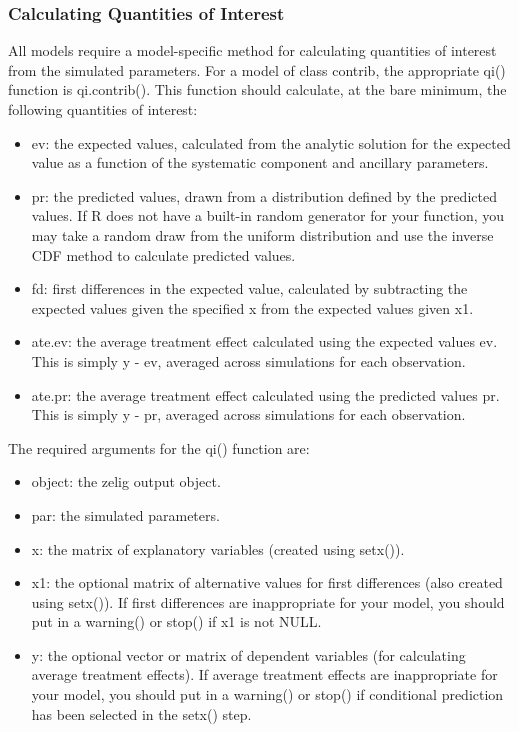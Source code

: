 \documentclass[letterpaper,10pt,english]{sphinxmanual}
\begin{document}
\subsubsection{Calculating Quantities of Interest}
\label{9_adding_models_and_methods:calculating-quantities-of-interest}
All models require a model-specific method for calculating quantities of
interest from the simulated parameters. For a model of class contrib,
the appropriate qi() function is qi.contrib(). This function should
calculate, at the bare minimum, the following quantities of interest:
\begin{itemize}
\item {} 
ev: the expected values, calculated from the analytic solution for
the expected value as a function of the systematic component and
ancillary parameters.

\item {} 
pr: the predicted values, drawn from a distribution defined by the
predicted values. If R does not have a built-in random generator for
your function, you may take a random draw from the uniform
distribution and use the inverse CDF method to calculate predicted
values.

\item {} 
fd: first differences in the expected value, calculated by
subtracting the expected values given the specified x from the
expected values given x1.

\item {} 
ate.ev: the average treatment effect calculated using the expected
values ev. This is simply y - ev, averaged across simulations for
each observation.

\item {} 
ate.pr: the average treatment effect calculated using the predicted
values pr. This is simply y - pr, averaged across simulations for
each observation.

\end{itemize}

The required arguments for the qi() function are:
\begin{itemize}
\item {} 
object: the zelig output object.

\item {} 
par: the simulated parameters.

\item {} 
x: the matrix of explanatory variables (created using setx()).

\item {} 
x1: the optional matrix of alternative values for first differences
(also created using setx()). If first differences are inappropriate
for your model, you should put in a warning() or stop() if x1 is not
NULL.

\item {} 
y: the optional vector or matrix of dependent variables (for
calculating average treatment effects). If average treatment effects
are inappropriate for your model, you should put in a warning() or
stop() if conditional prediction has been selected in the setx()
step.

\end{itemize}
\end{document}
